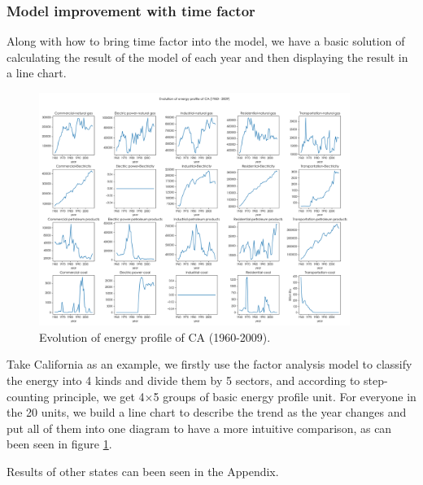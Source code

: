 \documentclass[a4paper,11pt]{article}
\begin{document}
\subsubsection{Model improvement with time factor}
\par Along with how to bring time factor into the model, we have a basic solution of calculating the result of the model of each year and then displaying the result in a line chart. 

\begin{figure}[h]%
    \centering 
    \includegraphics[width=0.9\textwidth]{./Pic/part-2-CA.png}
    \caption{Evolution of energy profile of CA (1960-2009).}
    \label{fig:part-2-CA}  
\end{figure}

\par Take California as an example, we firstly use the factor analysis model to classify the energy into 4 kinds and divide them by 5 sectors, and according to step-counting principle, we get 4$\times$5 groups of basic energy profile unit. For everyone in the 20 units, we build a line chart to describe the trend as the year changes and put all of them into one diagram to have a more intuitive comparison, as can been seen in figure \ref{fig:part-2-CA}.  
\par Results of other states can been seen in the Appendix. 
\end{document}
